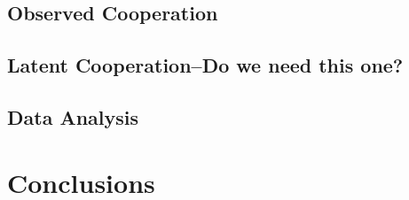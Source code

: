 \documentclass[12pt,onesided,fullpage]{amsart}
\begin{document}
\subsection{Observed Cooperation}
\subsection{Latent Cooperation--Do we need this one?}
\subsection{Data Analysis}

\section{Conclusions}
\end{document}

